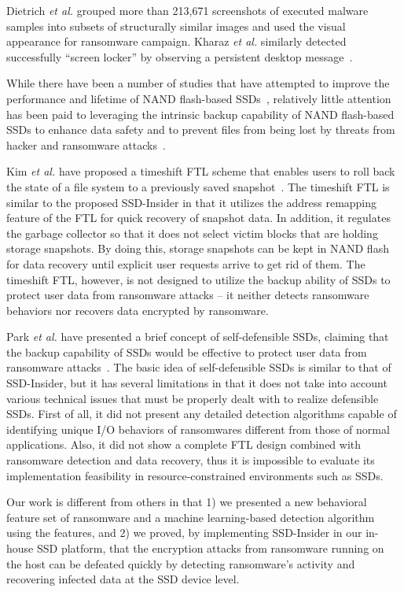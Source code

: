 \documentclass[conference]{IEEEtran}
\newcommand{\etal}{{\it et al.}\xspace}
\newcommand{\ours}{SSD-Insider}
\begin{document}
Dietrich \etal grouped more than 213,671 screenshots of executed
malware samples into subsets of structurally similar images and
used the visual appearance for ransomware campaign. Kharaz \etal
similarly detected successfully ``screen locker'' by observing a
persistent desktop message~\cite{kharaz}.

While there have been a number of studies that have attempted to
improve the performance and lifetime of NAND flash-based
SSDs~\cite{kim2002space, seong2010hydra}, relatively little
attention has been paid to leveraging the intrinsic backup
capability of NAND flash-based SSDs to enhance data safety and to
prevent files from being lost by threats from hacker and ransomware
attacks~\cite{paikposter}.

Kim \textit{et al.} have proposed a timeshift FTL scheme that
enables users to roll back the state of a file system to a
previously saved snapshot~\cite{ltftl}. The timeshift FTL is
similar to the proposed \ours{} in that it utilizes the address
remapping feature of the FTL for quick recovery of snapshot data.
In addition, it regulates the garbage collector so that it does not
select victim blocks that are holding storage snapshots. By doing
this, storage snapshots can be kept in NAND flash for data recovery
until explicit user requests arrive to get rid of them. The
timeshift FTL, however, is not designed to utilize the backup
ability of SSDs to protect user data from ransomware attacks -- it
neither detects ransomware behaviors nor recovers data encrypted by
ransomware. 

Park \textit{et al.} have presented a brief concept of
self-defensible SSDs, claiming that the backup capability of SSDs
would be effective to protect user data from ransomware
attacks~\cite{paikposter}. The basic idea of self-defensible SSDs
is similar to that of \ours{}, but it has several limitations in
that it does not take into account various technical issues that
must be properly dealt with to realize defensible SSDs.  First of
all, it did not present any detailed detection algorithms capable
of identifying unique I/O behaviors of ransomwares different from
those of normal applications. Also, it did not show a complete FTL
design combined with ransomware detection and data recovery, thus
it is impossible to evaluate its implementation feasibility in
resource-constrained environments such as SSDs.  

Our work is different from others in that 1) we presented a new
behavioral feature set of ransomware and a machine learning-based
detection algorithm using the features, and 2) we proved, by
implementing \ours{} in our in-house SSD platform, that the
encryption attacks from ransomware running on the host can be
defeated quickly by detecting ransomware's activity and recovering
infected data at the SSD device level.
\end{document}
